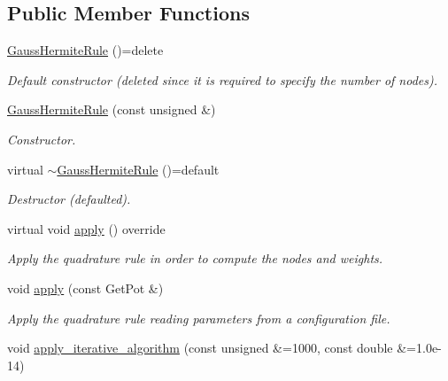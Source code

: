 \subsection*{Public Member Functions}
\begin{DoxyCompactItemize}
\item 
\hypertarget{classGaussHermiteRule_a82318908e412ac924a27d7c816c5e89d}{\hyperlink{classGaussHermiteRule_a82318908e412ac924a27d7c816c5e89d}{Gauss\-Hermite\-Rule} ()=delete}\label{classGaussHermiteRule_a82318908e412ac924a27d7c816c5e89d}

\begin{DoxyCompactList}\small\item\em Default constructor (deleted since it is required to specify the number of nodes). \end{DoxyCompactList}\item 
\hyperlink{classGaussHermiteRule_a578638d12f9b74af6a94428eb939e57a}{Gauss\-Hermite\-Rule} (const unsigned \&)
\begin{DoxyCompactList}\small\item\em Constructor. \end{DoxyCompactList}\item 
\hypertarget{classGaussHermiteRule_ade51ec8543da3071631a6e1dbf1ac9f7}{virtual \hyperlink{classGaussHermiteRule_ade51ec8543da3071631a6e1dbf1ac9f7}{$\sim$\-Gauss\-Hermite\-Rule} ()=default}\label{classGaussHermiteRule_ade51ec8543da3071631a6e1dbf1ac9f7}

\begin{DoxyCompactList}\small\item\em Destructor (defaulted). \end{DoxyCompactList}\item 
\hypertarget{classGaussHermiteRule_ae5502fed0f3128dce83d1280a834ffac}{virtual void \hyperlink{classGaussHermiteRule_ae5502fed0f3128dce83d1280a834ffac}{apply} () override}\label{classGaussHermiteRule_ae5502fed0f3128dce83d1280a834ffac}

\begin{DoxyCompactList}\small\item\em Apply the quadrature rule in order to compute the nodes and weights. \end{DoxyCompactList}\item 
void \hyperlink{classGaussHermiteRule_aedfa3b506bf5faafad17567ae2c6bed4}{apply} (const Get\-Pot \&)
\begin{DoxyCompactList}\small\item\em Apply the quadrature rule reading parameters from a configuration file. \end{DoxyCompactList}\item 
\hypertarget{classGaussHermiteRule_a5cbc7c77124838d27b8ccf686e5f7ff8}{void \hyperlink{classGaussHermiteRule_a5cbc7c77124838d27b8ccf686e5f7ff8}{apply\-\_\-iterative\-\_\-algorithm} (const unsigned \&=1000, const double \&=1.\-0e-\/14)}\label{classGaussHermiteRule_a5cbc7c77124838d27b8ccf686e5f7ff8}


\end{DoxyCompactItemize}

